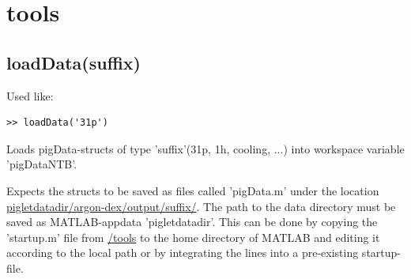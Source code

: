 \documentclass[10pt, a4paper]{article}
\begin{document}
\section{tools}
\subsection{loadData(suffix)}
Used like:

\begin{lstlisting}
>> loadData('31p')
\end{lstlisting}

Loads pigData-structs of type 'suffix'(31p, 1h, cooling, ...) into workspace variable 'pigDataNTB'. 

Expects the structs to be saved as files called 'pigData.m' under the location \url{pigletdatadir/argon-dex/output/suffix/}. The path to the data directory must be saved as MATLAB-appdata 'pigletdatadir'. This can be done by copying the 'startup.m' file from \url{/tools} to the home directory of MATLAB and editing it according to the local path or by integrating the lines into a pre-existing startup-file. 
\end{document}
